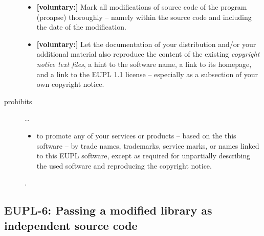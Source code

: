 \begin{description}
\begin{itemize}
  \item \textbf{[voluntary:]} Mark all modifications of source code of the
  program (proapse) thoroughly -- namely within the
  source code and including the date of the modification.
 
  \item \textbf{[voluntary:]} Let the documentation of your distribution and/or
  your additional material  also reproduce the content of the existing
  \emph{copyright notice text files}, a hint to the software name, a link to its
  homepage, and a link to the EUPL 1.1 license -- especially as a subsection of
  your own copyright notice.


\end{itemize}

\item[prohibits] \ldots
\begin{itemize}
  \item to promote any of your services or products -- based on the this software
  -- by trade names, trademarks, service marks, or names linked to this EUPL
  software, except as required for unpartially describing the used software and
  reproducing the copyright notice.
\end{itemize}.

\end{description}

\subsection{EUPL-6: Passing a modified library as independent source code}
\label{OSUC-08-EUPL}

